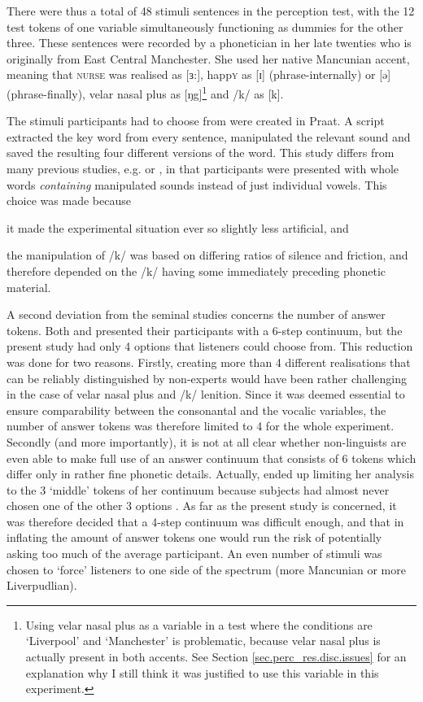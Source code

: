 There were thus a total of 48 stimuli sentences in the perception test, with the 12 test tokens of one variable simultaneously functioning as dummies for the other three.
These sentences were recorded by a phonetician in her late twenties who is originally from East Central Manchester.
She used her native Mancunian accent, meaning that \textsc{nurse} was realised as [ɜ:], happ\textsc{y} as [ɪ] (phrase-internally) or [ə] (phrase-finally), velar nasal plus as [ŋg]\footnote{Using velar nasal plus as a variable in a  test where the conditions are `Liverpool' and `Manchester' is problematic, because velar nasal plus is actually present in both accents. See Section \ref{sec.perc_res.disc.issues} for an explanation why I still think it was justified to use this variable in this  experiment.} and /k/ as [k].

The stimuli participants had to choose from were created in Praat.
A script extracted the key word from every sentence, manipulated the relevant sound and saved the resulting four different versions of the word.
This study differs from many previous studies, e.g. \citealt{hayetal2006a} or \citealt{niedzielski1999}, in that participants were presented with whole words \emph{containing} manipulated sounds instead of just individual vowels.
This choice was made because
\begin{inparaenum}[(a)]
	\item it made the experimental situation ever so slightly less artificial, and
	\item the manipulation of /k/ was based on differing ratios of silence and friction, and therefore depended on the /k/ having some immediately preceding phonetic material.
\end{inparaenum}
A second deviation from the seminal studies concerns the number of answer tokens.
Both \citeauthor{niedzielski1999} and \citeauthor{hayetal2006a} presented their participants with a 6-step continuum, but the present study had only 4 options that listeners could choose from.
This reduction was done for two reasons.
Firstly, creating more than 4 different realisations that can be reliably distinguished by non-experts would have been rather challenging in the case of velar nasal plus and /k/ lenition.
Since it was deemed essential to ensure comparability between the consonantal and the vocalic variables, the number of answer tokens was therefore limited to 4 for the whole experiment.
Secondly (and more importantly), it is not at all clear whether non-linguists are even able to make full use of an answer continuum that consists of 6 tokens which differ only in rather fine phonetic details.
Actually, \citealt{niedzielski1999} ended up limiting her analysis to the 3 `middle' tokens of her continuum because subjects had almost never chosen one of the other 3 options \parencite[cf.][64--65]{niedzielski1999}.
As far as the present study is concerned, it was therefore decided that a 4-step continuum was difficult enough, and that in inflating the amount of answer tokens one would run the risk of potentially asking too much of the average participant.
An even number of stimuli was chosen to `force' listeners to one side of the spectrum (more Mancunian or more Liverpudlian).

